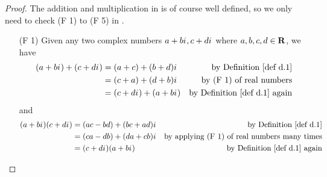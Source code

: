 \begin{proof}
The addition and multiplication in  is of course well defined, so we only need to check (F 1) to (F 5) in .

\begin{enumerate}
\item[(F 1)] Given any two complex numbers \(a + b {i\mkern1mu}, c + d {i\mkern1mu}\) where \(a, b, c, d \in \mathbf{R}\), we have
\begin{align*}
    (a + b\iu) + (c + d\iu) & = (a + c) + (b + d)\iu & \text{by \DEF{d.1}} \\
        & = (c + a) + (d + b)\iu & \text{by (F 1) of real numbers} \\
        & = (c + d\iu) + (a + b\iu) & \text{by \DEF{d.1} again}
\end{align*}
and
\begin{align*}
   (a + b\iu)(c + d\iu) & = (ac - bd) + (bc + ad)\iu & \text{by \DEF{d.1}} \\
        & = (ca - db) + (da + cb)\iu & \text{by applying (F 1) of real numbers many times} \\
        & = (c + d\iu)(a + b\iu) & \text{by \DEF{d.1} again}
\end{align*}


\end{enumerate}
\end{proof}
